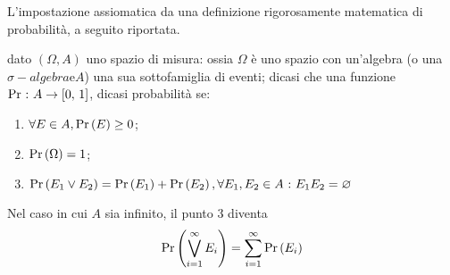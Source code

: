 \documentclass{subfiles}
\begin{document}
L'impostazione assiomatica da una definizione rigorosamente matematica di probabilità, a seguito riportata.
\begin{Definition*}
    dato \((\Omega, A)\) uno spazio di misura: ossia \(\Omega\) è uno spazio con un'algebra (o una \(\sigma-algebra \text{e} A\)) una sua sottofamiglia di eventi;
    dicasi che una funzione \(\Pr \Such A \to \Range*{0}{1}\), dicasi probabilità se:
    \begin{enumerate}
        \item \(\forall E \in A, \Prob{E} \ge 0\);
        \item \(\Prob{\Omega} = 1\);
        \item \(\Prob{E_{1} \lor E_{2}} = \Prob{E_{1}} + \Prob{E_{2}}, \forall E_{1}, E_{2} \in A \Such E_{1}E_{2} = \varnothing\)
    \end{enumerate}
    Nel caso in cui \(A\) sia infinito, il punto 3 diventa
    \[
        \Prob{\Bigvee{E_{i}}{i = 1}[\infty]} = \Sum{\Prob{E_{i}}}{i = 1}[\infty]
    \]
\end{Definition*}
\end{document}
